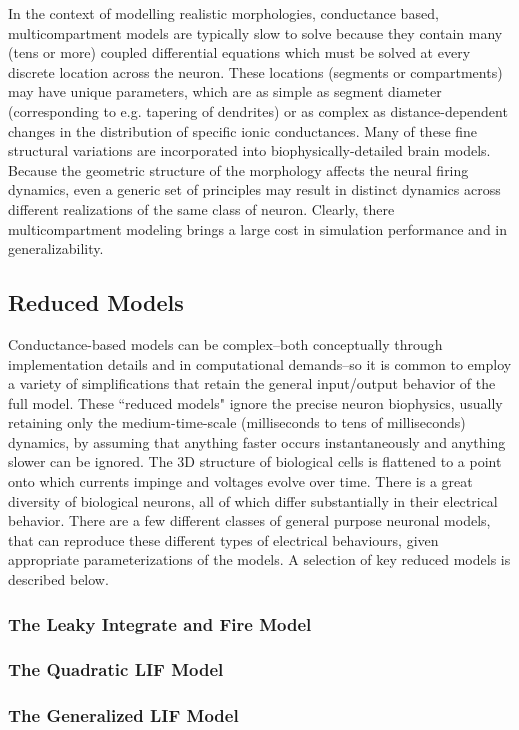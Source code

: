 In the context of modelling realistic morphologies, conductance based, multicompartment models are typically slow to solve because they contain many (tens or more) coupled differential equations which must be solved at every discrete location across the neuron.
These locations (segments or compartments) may have unique parameters, which are as simple as segment diameter (corresponding to e.g. tapering of dendrites) or as complex as distance-dependent changes in the distribution of specific ionic conductances.
Many of these fine structural variations are incorporated into biophysically-detailed brain models.  
Because the geometric structure of the morphology affects the neural firing dynamics, even a generic set of principles may result in distinct dynamics across different realizations of the same class of neuron.  
Clearly, there multicompartment modeling brings a large cost in simulation performance and in generalizability.

\subsection{Reduced Models}
Conductance-based models can be complex--both conceptually through implementation details and in computational demands--so it is common to employ a variety of simplifications that retain the general input/output behavior of the full model.
These ``reduced models" ignore the precise neuron biophysics, usually retaining only the medium-time-scale (milliseconds to tens of milliseconds) dynamics, by assuming that anything faster occurs instantaneously and anything slower can be ignored.
The 3D structure of biological cells is flattened to a point onto which currents impinge and voltages evolve over time. There is a great diversity of biological neurons, all of which differ substantially in their electrical behavior. There are a few different classes of general purpose neuronal models, that can reproduce these different types of electrical behaviours, given appropriate parameterizations of the models. A selection of key reduced models is described below.
\subsubsection{The Leaky Integrate and Fire Model}
\subsubsection{The Quadratic LIF Model}
\subsubsection{The Generalized LIF Model}

